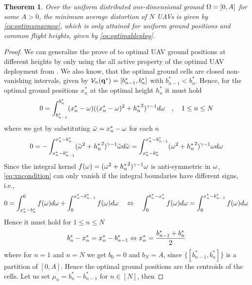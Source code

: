 \documentclass[smallabstract,smallcaptions]{dccpaper}
\newtheorem{theorem}{Theorem}
\newif\ifproof\prooffalse %
\newcommand{\Vor}{\ensuremath{\mathcal{V}}}         %
\begin{document}
\begin{theorem}\label{theorem:commonHeight}
  Over the uniform distributed one-dimensional ground $\Omega=[0,A]$ for some $A>0$,
  the minimum average distortion of $N$ UAVs is given by \eqref{eq:optimumavpow},
  which is only attained for uniform ground positions and common flight heights, given by  \eqref{eq:optimaldeploy}.
\end{theorem}
%
\ifproof
\begin{proof}
  We can generalize the prove of  to optimal UAV ground positions at different heights by only
  using the all active property of the optimal UAV deployment from  . We also know, that the
  optimal ground cells are closed non-vanishing intervals, given by $\Vor_n(\vq^*)=[b_{n-1}^*,b_n^*]$ with
  $b^*_{n-1}<b_n^*$.  Hence, for the optimal ground positions $x_n^*$ at the optimal height $h_n^*$ it must hold 
  \begin{align}
    0 = \int^{b^*_n}_{b_{n-1}^*} (x_n^*-\omega) ((x_n^*-\omega)^2+{h^{*}_n}^2)^{\gamma-1}d\omega \quad,\quad 1\leq n\leq
    N\label{eq:vornx_diffh}
  \end{align}
  where we get by substituting ${  \tilde{\omega} }=x_n^*-\omega$ for each $n$ 
  \begin{align}
    0=-\int_{x_n^*-b^*_{n-1}}^{x^*_n-b^*_{n}} ({  \tilde{\omega} }^2+{h^{*}_n}^2)^{\gamma-1}{  \tilde{\omega} } d{  \tilde{\omega} } 
    =\int_{x_n^*-b^*_{n}}^{x_n^*-b^*_{n-1}} (\omega^2+{h^{*}_n}^2)^{\gamma-1}\omega d\omega\label{eq:xncondition}
  \end{align}
  Since the integral kernel $f(\omega)=(\omega^2+{h^{*}_n}^2)^{\gamma-1}\omega$ is  anti-symmetric in $\omega$,
  \eqref{eq:xncondition} can only vanish if the integral boundaries have different signs, i.e.,
  \begin{align}
    0= \int_{x_n^*-b_{n}^*}^0 f(\omega)d\omega + \int_0^{x_n^*-b_{n-1}^*} f(\omega)d\omega 
    \quad    \Leftrightarrow \quad
        \int_0^{b^*_n-x_n^*} f(\omega)d\omega = \int_0^{x_n^*-b^*_{n-1}}f(\omega)d\omega 
        \notag
  \end{align}
  Hence it must hold  for $1\leq n\leq N$
  \begin{align}
    b^*_{n} -{x^{*}_n}={x^{*}_n}-b^*_{n-1} \Leftrightarrow  {\ensuremath{x^{*}}_n}=\frac{b_{n-1}^*+b_{n}^*}{2}\label{eq:bnoptimal}
  \end{align}
  where for $n=1$ and $n=N$ we get $b_0=0$ and $b_N=A$, since $\{[b^*_{n-1},b_n^*]\}$ is a partition of $[0,A]$. Hence
  the optimal ground positions are the centroids of the cells.  Let us set $\mu_n=b_n^*-b_{n-1}^*$ for $n\in[N]$, then

\end{proof}
\end{document}
